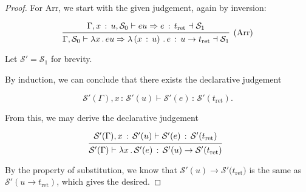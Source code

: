 \documentclass{article}
\newcommand{\G}{\Gamma}
\newcommand{\St}{\mathcal{S}}
\newcommand{\tret}{t_{\text{ret}}}
\newcommand{\uv}{u}
\newcommand{\eu}{eu}
\newcommand{\e}{e}
\newcommand{\x}{x}
\renewcommand{\implies}{\Rightarrow}
\newcommand{\withtp}[2]{{#1} \,:\, {#2}}
\newcommand{\lam}[2]{\lambda {#1} \,.\, {#2}}
\newcommand{\lamtp}[3]{\lambda \left( {\withtp {#1} {#2}} \right) \,.\, {#3}}
\newcommand{\arr}[2]{{#1} \to {#2}}
\newcommand{\hastp}[3]{#1 \vdash {\withtp {#2} {#3}}}
\newcommand{\algtp}[6]{#1, #2 \vdash #3 \implies {\withtp {#4} {#5}} \dashv #6}
\newcommand{\deduct}[3][]
{
  \begin{prooftree}
    \hypo{#2}
    \infer1[\text{#1}]{#3}
  \end{prooftree}
}
\begin{document}
\begin{proof}
  For Arr, we start with the given judgement, again by inversion:

\[
  \deduct
  {
    \algtp {\G, \withtp \x {\uv}} {\St_0} \eu \e \tret {\St_1}
  }
  {\algtp \G {\St_0} {\lam \x \eu} {\lamtp \x {\uv} \e} {\arr {\uv} {\tret}} {\St_1}}
  {\text{(Arr)}}
\]

  Let \(\St' = \St_1\) for brevity.

  By induction, we can conclude that there exists the declarative judgement

  \[ \hastp {\St'(\G), \withtp \x {\St'(\uv)}} {\St'(\e)} {\St'(\tret)}.\]

  From this, we may derive the declarative judgement

  \[
    \deduct
    {\hastp {\St'(\G), \withtp \x {\St'(\uv)}} {\St'(\e)} {\St'(\tret)}}
    {\hastp {\St'(\G)} {\lam \x {\St'(\e)}} {\arr {\St'(\uv)} {\St'(\tret)}}}
  \]
  
  By the property of substitution, we know that \({\arr {\St'(\uv)}
  {\St'(\tret})}\) is the same as \(\St'(\arr {\uv} {\tret})\), which gives
  the desired.

\end{proof}
\end{document}
